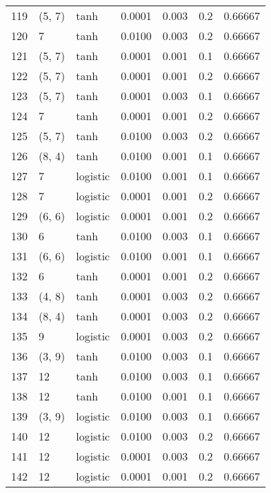 \begin{tabular}{lllrrrr}
119 &      (5, 7) &      tanh &  0.0001 &  0.003 &  0.2 &   0.66667 \\
120 &           7 &      tanh &  0.0100 &  0.003 &  0.2 &   0.66667 \\
121 &      (5, 7) &      tanh &  0.0001 &  0.001 &  0.1 &   0.66667 \\
122 &      (5, 7) &      tanh &  0.0001 &  0.001 &  0.2 &   0.66667 \\
123 &      (5, 7) &      tanh &  0.0001 &  0.003 &  0.1 &   0.66667 \\
124 &           7 &      tanh &  0.0001 &  0.001 &  0.2 &   0.66667 \\
125 &      (5, 7) &      tanh &  0.0100 &  0.003 &  0.2 &   0.66667 \\
126 &      (8, 4) &      tanh &  0.0100 &  0.001 &  0.1 &   0.66667 \\
127 &           7 &  logistic &  0.0100 &  0.001 &  0.1 &   0.66667 \\
128 &           7 &  logistic &  0.0001 &  0.001 &  0.2 &   0.66667 \\
129 &      (6, 6) &  logistic &  0.0001 &  0.001 &  0.2 &   0.66667 \\
130 &           6 &      tanh &  0.0100 &  0.003 &  0.1 &   0.66667 \\
131 &      (6, 6) &  logistic &  0.0100 &  0.001 &  0.1 &   0.66667 \\
132 &           6 &      tanh &  0.0001 &  0.001 &  0.2 &   0.66667 \\
133 &      (4, 8) &      tanh &  0.0001 &  0.003 &  0.2 &   0.66667 \\
134 &      (8, 4) &      tanh &  0.0001 &  0.003 &  0.2 &   0.66667 \\
135 &           9 &  logistic &  0.0001 &  0.003 &  0.2 &   0.66667 \\
136 &      (3, 9) &      tanh &  0.0100 &  0.003 &  0.1 &   0.66667 \\
137 &          12 &      tanh &  0.0100 &  0.003 &  0.1 &   0.66667 \\
138 &          12 &      tanh &  0.0100 &  0.001 &  0.1 &   0.66667 \\
139 &      (3, 9) &  logistic &  0.0100 &  0.003 &  0.1 &   0.66667 \\
140 &          12 &  logistic &  0.0100 &  0.003 &  0.2 &   0.66667 \\
141 &          12 &  logistic &  0.0001 &  0.003 &  0.2 &   0.66667 \\
142 &          12 &  logistic &  0.0001 &  0.001 &  0.2 &   0.66667 \\

\end{tabular}

